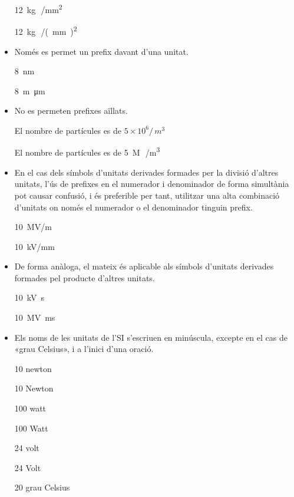 \begin{itemize}
\textcolor{Green}\faCheckSquare{}  \SI{12}{kg\,/mm^2}

\textcolor{Red}\faTimesCircle{}  \SI{12}{kg\,/(mm)^2}


\item Només es permet un prefix davant d'una unitat.

\textcolor{Green}\faCheckSquare{} \SI{8}{nm}

\textcolor{Red}\faTimesCircle{} \SI{8}{m\micro m}


\item No es permeten prefixes aïllats.

\textcolor{Green}\faCheckSquare{} El nombre de partícules es de $5\times 10^6 /\si{\,m^3}$

\textcolor{Red}\faTimesCircle{} El nombre de partícules es de \SI{5}{M\,/m^3}


\item En el cas dels símbols d'unitats derivades formades per la divisió
d'altres unitats, l'ús de prefixes en el numerador i denominador de
forma simultània pot causar confusió, i és preferible per tant,
utilitzar una alta combinació d'unitats on només el numerador o el
denominador tinguin prefix.

\textcolor{Green}\faCheckSquare{} \SI{10}{MV/m}

\textcolor{Blue}\faQuestionCircle{}  \SI{10}{kV/mm}


\item De forma anàloga, el mateix és aplicable als símbols d'unitats
derivades formades pel producte d'altres unitats.

\textcolor{Green}\faCheckSquare{} \SI{10}{kV.s}

\textcolor{Blue}\faQuestionCircle{}  \SI{10}{MV.ms}


\item Els noms de les unitats de l'SI s'escriuen en minúscula, excepte en
el cas de «grau Celsius», i a l'inici d'una oració.

\textcolor{Green}\faCheckSquare{} 10 newton

\textcolor{Red}\faTimesCircle{} 10 Newton

\textcolor{Green}\faCheckSquare{}  100 watt

\textcolor{Red}\faTimesCircle{} 100 Watt

\textcolor{Green}\faCheckSquare{}  24 volt

\textcolor{Red}\faTimesCircle{} 24 Volt

\textcolor{Green}\faCheckSquare{}  20 grau Celsius


\end{itemize}
